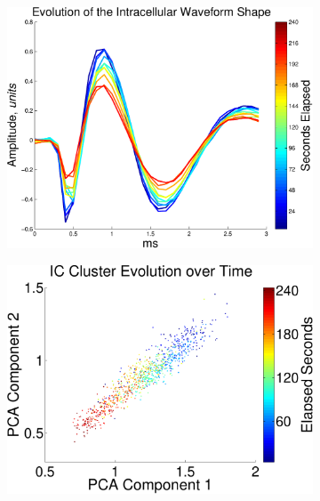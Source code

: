 \begin{center}
\begin{figure}
\begin{subfigure}[b]{.33\textwidth}
\includegraphics[width=\textwidth]{../figs/evohc1}
\caption{}
\label{evohc1}
\end{subfigure}
\begin{subfigure}[b]{.33\textwidth}
\includegraphics[width=\textwidth]{../figs/new/clusterevo.pdf}
\caption{}
\label{clusterevo}
\end{subfigure}
\begin{subfigure}[b]{.33\textwidth}

\end{subfigure}
\end{figure}
\end{center}
